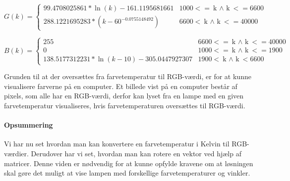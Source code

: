 \begin{displaymath}
   G(k) = \left\{
     \begin{array}{lr}
       99.4708025861*\ln(k)-161.1195681661 &1000 <= \text{k $\land$ k} <= 6600\\
       288.1221695283*(k-60^{-0.0755148492}) &6600 < \text{k $\land$ k} <= 40000
     \end{array}
   \right.
\end{displaymath} 

\begin{displaymath}
   B(k) = \left\{
     \begin{array}{lr}
       255 &6600 <= \text{k $\land$ k} <= 40000\\
       0 &1000 <= \text{k $\land$ k} <= 1900\\
       138.5177312231 * \ln(k-10) - 305.0447927307 &1900 < \text{k $\land$ k} < 6600
     \end{array}
   \right.
\end{displaymath} 

Grunden til at der oversættes fra farvetemperatur til RGB-værdi, er for at kunne visualisere farverne på en computer. Et billede vist på en computer består af pixels, som alle har en RGB-værdi, derfor kan lyset fra en lampe med en given farvetemperatur visualiseres, hvis farvetemperaturen oversættes til RGB-værdi.

\paragraph*{Opsummering}
Vi har nu set hvordan man kan konvertere en farvetemperatur i Kelvin til RGB-værdier. Derudover har vi set, hvordan man kan rotere en vektor ved hjælp af matricer. Denne viden er nødvendig for at kunne opfylde kravene om at løsningen skal gøre det muligt at vise lampen med forskellige farvetemperaturer og vinkler. 









